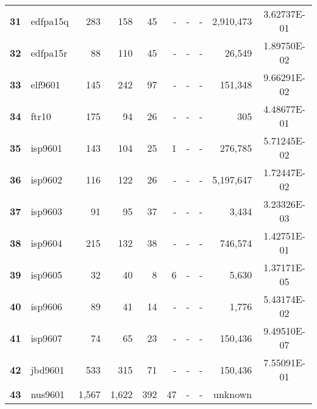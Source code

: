 \begin{longtable}{@{}llrrrrrrrc@{}}
\textbf{31} & edfpa15q & 283                  & 158      & 45      & -    & -    & -     & 2,910,473            & 3.62737E-01 \\
\textbf{32} & edfpa15r & 88                   & 110      & 45      & -    & -    & -     & 26,549               & 1.89750E-02 \\
\textbf{33} & elf9601  & 145                  & 242      & 97      & -    & -    & -     & 151,348              & 9.66291E-02 \\
\textbf{34} & ftr10    & 175                  & 94       & 26      & -    & -    & -     & 305                  & 4.48677E-01 \\
\textbf{35} & isp9601  & 143                  & 104      & 25      & 1    & -    & -     & 276,785              & 5.71245E-02 \\
\textbf{36} & isp9602  & 116                  & 122      & 26      & -    & -    & -     & 5,197,647            & 1.72447E-02 \\
\textbf{37} & isp9603  & 91                   & 95       & 37      & -    & -    & -     & 3,434                & 3.23326E-03 \\
\textbf{38} & isp9604  & 215                  & 132      & 38      & -    & -    & -     & 746,574              & 1.42751E-01 \\
\textbf{39} & isp9605  & 32                   & 40       & 8       & 6    & -    & -     & 5,630                & 1.37171E-05 \\
\textbf{40} & isp9606  & 89                   & 41       & 14      & -    & -    & -     & 1,776                & 5.43174E-02 \\
\textbf{41} & isp9607  & 74                   & 65       & 23      & -    & -    & -     & 150,436              & 9.49510E-07 \\
\textbf{42} & jbd9601  & 533                  & 315      & 71      & -    & -    & -     & 150,436              & 7.55091E-01 \\
\textbf{43} & nus9601  & 1,567                & 1,622    & 392     & 47   & -    & -     & unknown     \\* \bottomrule
\end{longtable}